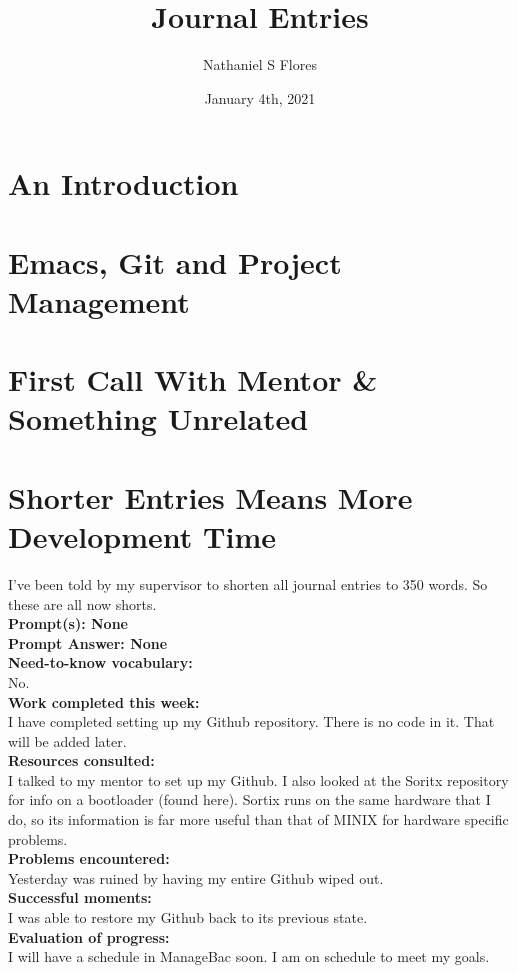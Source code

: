 \documentclass[11pt]{article}
\title{\textbf{Journal Entries}}
\author{Nathaniel S Flores}
\date{January 4th, 2021}
\begin{document}
\maketitle
{}
\tableofcontents
\newpage
{}
\section{An Introduction}

\section{Emacs, Git and Project Management}
\section{First Call With Mentor \& Something Unrelated}
\section{Shorter Entries Means More Development Time}
I've been told by my supervisor to shorten all journal entries to 350 words. So these are all now shorts.\\
\textbf{Prompt(s): None}\\
\textbf{Prompt Answer: None}\\
\textbf{Need-to-know vocabulary:}\\
No.\\
\textbf{Work completed this week:}\\
I have completed setting up my Github repository. There is no code in it. That will be added later.\\
\textbf{Resources consulted:}\\
I talked to my mentor to set up my Github. I also looked at the Soritx repository for info on a bootloader (found here). Sortix runs on the same hardware that I do, so its information is far more useful than that of MINIX for hardware specific problems.\\
\textbf{Problems encountered:}\\
Yesterday was ruined by having my entire Github wiped out.\\
\textbf{Successful moments:}\\
I was able to restore my Github back to its previous state.\\
\textbf{Evaluation of progress:}\\
I will have a schedule in ManageBac soon. I am on schedule to meet my goals.
\end{document}
